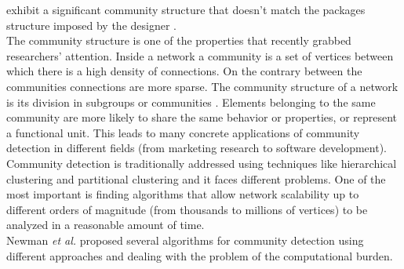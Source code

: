exhibit a significant community structure that doesn't match the packages structure imposed by the designer \cite{Subelj:2011}. 
\\
The community structure is 
one of the properties that recently grabbed researchers' attention. 
Inside a network a community is a set of vertices between which there is a high density of connections. 
On the contrary between the communities connections are more sparse. The community structure of a network is its 
division in subgroups or communities \cite{NG:2004}.
Elements belonging to the same community are more likely to share the same behavior or properties, or represent a functional unit. 
This leads to many concrete applications of community detection in different fields (from marketing research to software development). 
\\
Community detection is traditionally addressed using techniques like hierarchical clustering and partitional clustering 
\cite{Fortunato:2010} and it faces different problems. One of the most important is finding algorithms that allow network
scalability up to different orders of magnitude 
(from thousands to millions of vertices) to be analyzed in a reasonable amount of time. 
\\
Newman \textit{et al.} proposed several algorithms for community detection
\cite{NG:2004, NFast:2004, Clauset:2004} using different approaches and dealing with the problem of the computational burden. 
